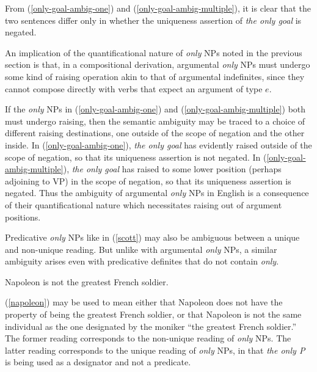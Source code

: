 From (\ref{only-goal-ambig-one}) and (\ref{only-goal-ambig-multiple}), it is clear that the two sentences differ only in whether the uniqueness assertion of \textit{the only goal} is negated.

An implication of the quantificational nature of \textit{only} NPs noted in the previous section is that, in a compositional derivation, argumental \textit{only} NPs must undergo some kind of raising operation akin to that of argumental indefinites, since they cannot compose directly with verbs that expect an argument of type $e$.

If the \textit{only} NPs in (\ref{only-goal-ambig-one}) and (\ref{only-goal-ambig-multiple}) both must undergo raising, then the semantic ambiguity may be traced to a choice of different raising destinations, one outside of the scope of negation and the other inside. In (\ref{only-goal-ambig-one}), \textit{the only goal} has evidently raised outside of the scope of negation, so that its uniqueness assertion is not negated. In (\ref{only-goal-ambig-multiple}), \textit{the only goal} has raised to some lower position (perhaps adjoining to VP) in the scope of negation, so that its uniqueness assertion is negated. Thus the ambiguity of argumental \textit{only} NPs in English is a consequence of their quantificational nature which necessitates raising out of argument positions.

Predicative \textit{only} NPs like in (\ref{scott}) may also be ambiguous between a unique and non-unique reading. But unlike with argumental \textit{only} NPs, a similar ambiguity arises even with predicative definites that do not contain \textit{only}.

\begin{exe}
	\ex \label{napoleon} Napoleon is not the greatest French soldier.
\end{exe}

(\ref{napoleon}) may be used to mean either that Napoleon does not have the property of being the greatest French soldier, or that Napoleon is not the same individual as the one designated by the moniker ``the greatest French soldier.'' The former reading corresponds to the non-unique reading of \textit{only} NPs. The latter reading corresponds to the unique reading of \textit{only} NPs, in that \textit{the only P} is being used as a designator and not a predicate.

